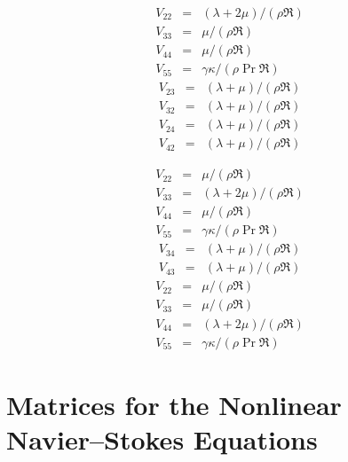 \bigskip
{}
%
\begin{eqnarray} 
  V_{22} &=& (\lambda + 2 \mu) / (\rho \Re) \\
  V_{33} &=& \mu / (\rho \Re) \\
  V_{44} &=& \mu / (\rho \Re) \\
  V_{55} &=& \gamma\kappa / (\rho \Pr \Re)
\end{eqnarray}
\bigskip
{}
%
\begin{eqnarray} 
  V_{23} &=& (\lambda + \mu) / (\rho \Re) \\
  V_{32} &=& (\lambda + \mu) / (\rho \Re)
\end{eqnarray}
\bigskip
{}
%
\begin{eqnarray} 
  V_{24} &=& (\lambda + \mu) / (\rho \Re) \\
  V_{42} &=& (\lambda + \mu) / (\rho \Re)
\end{eqnarray}

\pagebreak
{}
%
\begin{eqnarray} 
  V_{22} &=& \mu / (\rho \Re) \\
  V_{33} &=& (\lambda + 2 \mu) / (\rho \Re) \\
  V_{44} &=& \mu / (\rho \Re) \\
  V_{55} &=& \gamma\kappa / (\rho \Pr \Re)
\end{eqnarray}
%
\begin{eqnarray} 
  V_{34} &=& (\lambda + \mu) / (\rho \Re) \\
  V_{43} &=& (\lambda + \mu) / (\rho \Re)
\end{eqnarray}
\bigskip
{}
%
\begin{eqnarray} 
  V_{22} &=& \mu / (\rho \Re) \\
  V_{33} &=& \mu / (\rho \Re) \\
  V_{44} &=& (\lambda + 2 \mu) / (\rho \Re) \\
  V_{55} &=& \gamma\kappa / (\rho \Pr \Re)
\end{eqnarray}


\pagebreak
\section[Matrices for the Nonlinear Navier--Stokes Equations]{Matrices 
for the Nonlinear \protect\\ Navier--Stokes Equations \label{a:nlinmat}}

